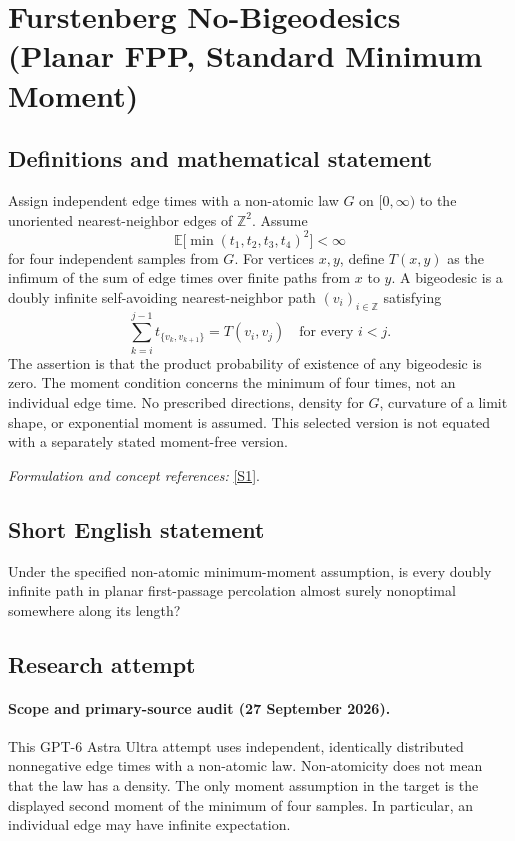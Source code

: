 \documentclass[11pt]{article}
\begin{document}
\section*{\texorpdfstring{Furstenberg No-Bigeodesics (Planar FPP, Standard Minimum Moment)}{Furstenberg No-Bigeodesics (Planar FPP, Standard Minimum Moment)}}\label{485}
\subsection{Definitions and mathematical statement}
Assign independent edge times with a non-atomic law $G$ on $[0,\infty)$ to the unoriented nearest-neighbor edges of ${\mathbb{Z}}^2$. Assume
\[
 {\mathbb{E}}\bigl[\min(t_1,t_2,t_3,t_4)^2\bigr]<\infty
\]
for four independent samples from $G$. For vertices $x,y$, define $T(x,y)$ as the infimum of the sum of edge times over finite paths from $x$ to $y$. A bigeodesic is a doubly infinite self-avoiding nearest-neighbor path $(v_i)_{i\in{\mathbb{Z}}}$ satisfying
\[
 \sum_{k=i}^{j-1}t_{\{v_k,v_{k+1}\}}=T(v_i,v_j)
 \quad\text{for every }i<j.
\]
The assertion is that the product probability of existence of any bigeodesic is zero. The moment condition concerns the minimum of four times, not an individual edge time. No prescribed directions, density for $G$, curvature of a limit shape, or exponential moment is assumed. This selected version is not equated with a separately stated moment-free version.
\par\smallskip\textit{Formulation and concept references:} \href{https://arxiv.org/pdf/1512.00804}{[S1]}.

\subsection{Short English statement}
Under the specified non-atomic minimum-moment assumption, is every doubly infinite path in planar first-passage percolation almost surely nonoptimal somewhere along its length?
\subsection{Research attempt}

\paragraph{Scope and primary-source audit (27 September 2026).}
This GPT-6 Astra Ultra attempt uses independent, identically distributed
nonnegative edge times with a non-atomic law. Non-atomicity does not mean
that the law has a density. The only moment assumption in the target is
the displayed second moment of the minimum of four samples. In particular,
an individual edge may have infinite expectation.
\end{document}
